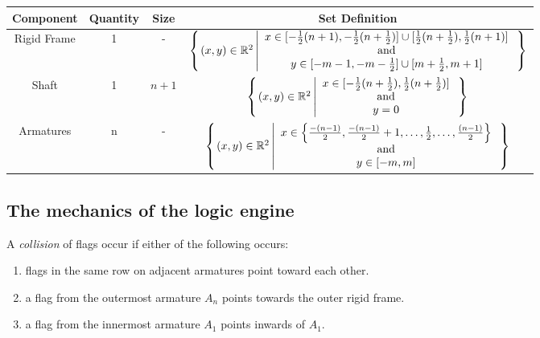 \begin{tabular}{|c|c|c|c|}
\hline
Component & Quantity & Size & Set Definition\\\hline
Rigid Frame&1&-&${\left\lbrace \left. (x,y)\in{\mathbb{R}}^2 \left\vert \begin{array}{c}
					x \in [-\frac{1}{2}(n + 
1),-\frac{1}{2}(n+\frac{1}{2})] \cup 
[\frac{1}{2}(n+\frac{1}{2}),\frac{1}{2}(n+1)] \\
\text{ and }\\
y \in [-m - 1,-m-\frac{1}{2}] \cup 
[m+\frac{1}{2},m+1]
                                      \end{array}
                                     \right.\right.\right\rbrace }$\\\hline
Shaft&1&$n+1$&${\left\lbrace \left. (x,y) \in {\mathbb{R}}^2 \left\vert 
\begin{array}{c}
x \in 
[-\frac{1}{2}(n+\frac{1}{2}),\frac{1}{2}(n+\frac{1}{2})]\\ 
\text{ and }\\
y=0
\end{array}
 \right.\right.\right\rbrace }$\\\hline
Armatures&n&-&${\left\lbrace \left. (x,y)\in{\mathbb{R}}^2 \left\vert 
\begin{array}{c}
x \in \left\lbrace \frac{-(n-1)}{2},\frac{-(n-1)}{2} + 1 ,\dots, 
\frac{1}{2}, \dots,\frac{(n-1)}{2} \right\rbrace\\ 
\text{ and } \\
y \in [-m,m]
\end{array}
  \right.\right.\right\rbrace }$\\\hline
\end{tabular}
\subsection{The mechanics of the logic engine}
A \textit{collision} of flags occur if either of the following occurs:
\begin{enumerate}
\item flags in the same row on adjacent armatures point toward each other.
\item a flag from the outermost armature $A_n$ points towards the outer rigid frame.
\item a flag from the innermost armature $A_1$ points inwards of $A_1$.
\end{enumerate}

